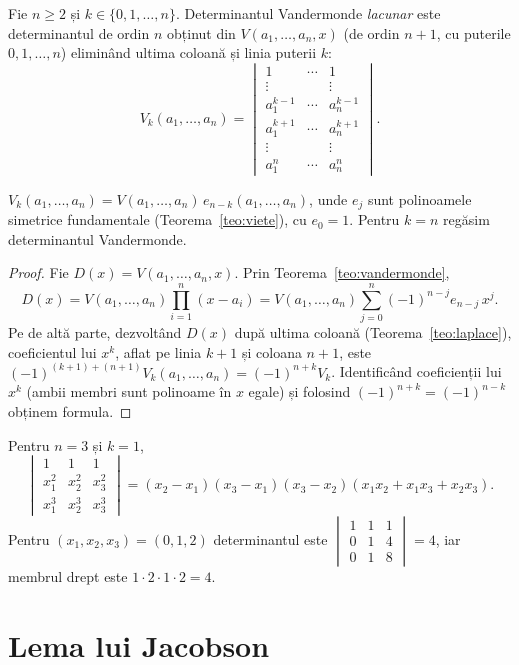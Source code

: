 Fie $n\ge2$ și $k\in\{0,1,\dots,n\}$. Determinantul Vandermonde \emph{lacunar} este determinantul de ordin $n$ obținut din $V(a_1,\dots,a_n,x)$ (de ordin $n+1$, cu puterile $0,1,\dots,n$) eliminând ultima coloană și linia puterii $k$:
\[
V_k(a_1,\dots,a_n)=
\begin{vmatrix}
1 & \cdots & 1 \\
\vdots & & \vdots \\
a_1^{k-1} & \cdots & a_n^{k-1} \\
a_1^{k+1} & \cdots & a_n^{k+1} \\
\vdots & & \vdots \\
a_1^{n} & \cdots & a_n^{n}
\end{vmatrix}.
\]

\begin{teorema}\label{teo:vandermondelacunar}
$V_k(a_1,\dots,a_n)=V(a_1,\dots,a_n)\,e_{n-k}(a_1,\dots,a_n)$, unde $e_j$ sunt polinoamele simetrice fundamentale (Teorema~\ref{teo:viete}), cu $e_0=1$. Pentru $k=n$ regăsim determinantul Vandermonde.
\end{teorema}

\begin{proof}
Fie $D(x)=V(a_1,\dots,a_n,x)$. Prin Teorema~\ref{teo:vandermonde},
\[
D(x)=V(a_1,\dots,a_n)\prod_{i=1}^n(x-a_i)=V(a_1,\dots,a_n)\sum_{j=0}^n(-1)^{n-j}e_{n-j}\,x^j .
\]
Pe de altă parte, dezvoltând $D(x)$ după ultima coloană (Teorema~\ref{teo:laplace}), coeficientul lui $x^k$, aflat pe linia $k+1$ și coloana $n+1$, este $(-1)^{(k+1)+(n+1)}V_k(a_1,\dots,a_n)=(-1)^{n+k}V_k$. Identificând coeficienții lui $x^k$ (ambii membri sunt polinoame în $x$ egale) și folosind $(-1)^{n+k}=(-1)^{n-k}$ obținem formula.
\end{proof}

\begin{exemplu}
Pentru $n=3$ și $k=1$,
\[
\begin{vmatrix}1&1&1\\x_1^2&x_2^2&x_3^2\\x_1^3&x_2^3&x_3^3\end{vmatrix}=(x_2-x_1)(x_3-x_1)(x_3-x_2)(x_1x_2+x_1x_3+x_2x_3).
\]
Pentru $(x_1,x_2,x_3)=(0,1,2)$ determinantul este $\begin{vmatrix}1&1&1\\0&1&4\\0&1&8\end{vmatrix}=4$, iar membrul drept este $1\cdot2\cdot1\cdot2=4$.
\end{exemplu}

\section{Lema lui Jacobson}


